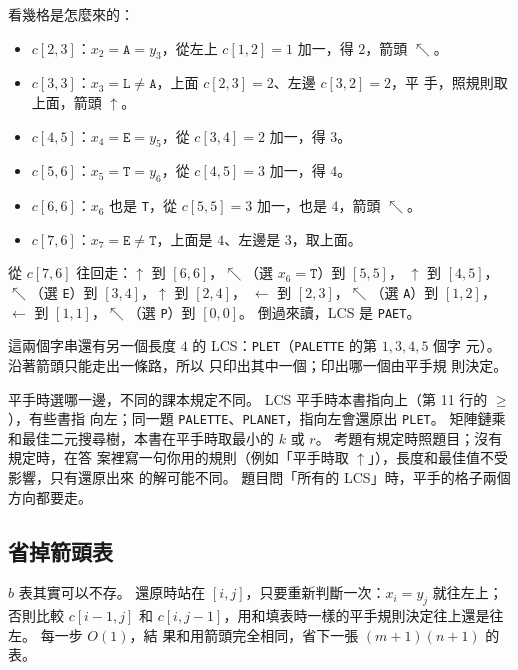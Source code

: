 看幾格是怎麼來的：
\begin{itemize}
\item $c[2, 3]$：$x_2 = \texttt{A} = y_3$，從左上 $c[1, 2] = 1$ 加一，得 $2$，箭頭 $\nwarrow$。
\item $c[3, 3]$：$x_3 = \texttt{L} \ne \texttt{A}$，上面 $c[2, 3] = 2$、左邊 $c[3, 2] = 2$，平
手，照規則取上面，箭頭 $\uparrow$。
\item $c[4, 5]$：$x_4 = \texttt{E} = y_5$，從 $c[3, 4] = 2$ 加一，得 $3$。
\item $c[5, 6]$：$x_5 = \texttt{T} = y_6$，從 $c[4, 5] = 3$ 加一，得 $4$。
\item $c[6, 6]$：$x_6$ 也是 \texttt{T}，從 $c[5, 5] = 3$ 加一，也是 $4$，箭頭 $\nwarrow$。
\item $c[7, 6]$：$x_7 = \texttt{E} \ne \texttt{T}$，上面是 $4$、左邊是 $3$，取上面。
\end{itemize}

從 $c[7, 6]$ 往回走：$\uparrow$ 到 $[6, 6]$，$\nwarrow$（選 $x_6 = \texttt{T}$）到 $[5, 5]$，
$\uparrow$ 到 $[4, 5]$，$\nwarrow$（選 \texttt{E}）到 $[3, 4]$，$\uparrow$ 到 $[2, 4]$，
$\leftarrow$ 到 $[2, 3]$，$\nwarrow$（選 \texttt{A}）到 $[1, 2]$，$\leftarrow$ 到
$[1, 1]$，$\nwarrow$（選 \texttt{P}）到 $[0, 0]$。 倒過來讀，LCS 是 \texttt{PAET}。

這兩個字串還有另一個長度 $4$ 的 LCS：\texttt{PLET}（\texttt{PALETTE} 的第 $1, 3, 4, 5$ 個字
元）。 沿著箭頭只能走出一條路，所以  只印出其中一個；印出哪一個由平手規
則決定。

\begin{examnote}
平手時選哪一邊，不同的課本規定不同。 LCS 平手時本書指向上（第 11 行的 $\ge$），有些書指
向左；同一題 \texttt{PALETTE}、\texttt{PLANET}，指向左會還原出 \texttt{PLET}。 矩陣鏈乘
和最佳二元搜尋樹，本書在平手時取最小的 $k$ 或 $r$。 考題有規定時照題目；沒有規定時，在答
案裡寫一句你用的規則（例如「平手時取 $\uparrow$」），長度和最佳值不受影響，只有還原出來
的解可能不同。 題目問「所有的 LCS」時，平手的格子兩個方向都要走。
\end{examnote}

\subsection{省掉箭頭表}

$b$ 表其實可以不存。 還原時站在 $[i, j]$，只要重新判斷一次：$x_i = y_j$ 就往左上；否則比較
$c[i-1, j]$ 和 $c[i, j-1]$，用和填表時一樣的平手規則決定往上還是往左。 每一步 $O(1)$，結
果和用箭頭完全相同，省下一張 $(m+1)(n+1)$ 的表。

